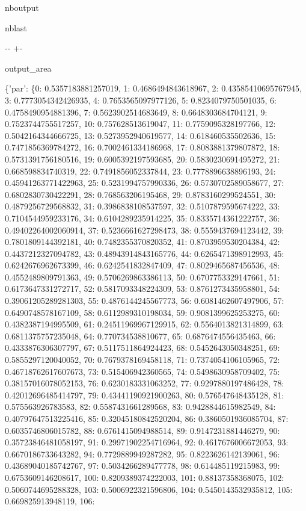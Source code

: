 \documentclass[letterpaper,10pt,english]{sphinxmanual}
\begin{document}
\begin{sphinxuseclass}{nboutput}
\begin{sphinxuseclass}{nblast}
{

\kern-\sphinxverbatimsmallskipamount\kern-\baselineskip
\kern+\FrameHeightAdjust\kern-\fboxrule
\vspace{\nbsphinxcodecellspacing}

\begin{sphinxuseclass}{output_area}
\begin{sphinxuseclass}{}


\begin{sphinxVerbatim}[commandchars=\\\{\}]
\{'par': \{0: 0.5357183881257019, 1: 0.4686494843618967, 2: 0.43585410695767945, 3: 0.7773054342426935, 4: 0.7653565097977126, 5: 0.8234079750501035, 6: 0.4758490954881396, 7: 0.5623902514683649, 8: 0.6648303684704121, 9: 0.7523744755517257, 10: 0.757628513619047, 11: 0.7759095328197766, 12: 0.5042164344666725, 13: 0.5273952940619577, 14: 0.618460535502636, 15: 0.7471856369784272, 16: 0.7002461334186968, 17: 0.8083881379807872, 18: 0.5731391756180516, 19: 0.6005392197593685, 20: 0.5830230691495272, 21: 0.668598834740319, 22: 0.7491856052337844, 23: 0.7778896638896193, 24: 0.45941263771422963, 25: 0.5231994757990336, 26: 0.5730702589058677, 27: 0.6802830730422291, 28: 0.768563206195468, 29: 0.8783160299524551, 30: 0.4879256729568832, 31: 0.3986838108537597, 32: 0.5107879595674222, 33: 0.7104544959233176, 34: 0.6104289235914225, 35: 0.8335714361222757, 36: 0.49402264002060914, 37: 0.5236661627298473, 38: 0.5559437694123442, 39: 0.7801809144392181, 40: 0.7482355370820352, 41: 0.8703959530204384, 42: 0.4437212327094782, 43: 0.48943914843165776, 44: 0.6265471398912993, 45: 0.6242676962673399, 46: 0.6242541832847409, 47: 0.8029465687456536, 48: 0.4552489809791363, 49: 0.5706269863386113, 50: 0.6707753329147661, 51: 0.6173647331272717, 52: 0.5817093348224309, 53: 0.8761273435958801, 54: 0.39061205289281303, 55: 0.4876144245567773, 56: 0.6081462607497906, 57: 0.6490748578167109, 58: 0.6112989310198034, 59: 0.9081399625253275, 60: 0.4382387194995509, 61: 0.24511969967129915, 62: 0.5564013821314899, 63: 0.6811375757235048, 64: 0.770734538810677, 65: 0.6876474556435463, 66: 0.4333876306307797, 67: 0.5117511864924423, 68: 0.5452643050348251, 69: 0.5855297120040052, 70: 0.7679378169458118, 71: 0.7374054106105965, 72: 0.46718762617607673, 73: 0.515406942360565, 74: 0.5498630958709402, 75: 0.38157016078052153, 76: 0.6230183331063252, 77: 0.9297880197486428, 78: 0.42012696485414797, 79: 0.43441190921900263, 80: 0.576547648435128, 81: 0.575563926783583, 82: 0.5587431661289568, 83: 0.9428844615982549, 84: 0.40797647513225416, 85: 0.32045180842520204, 86: 0.3860501936085704, 87: 0.6035746806015782, 88: 0.6761415094988514, 89: 0.9147231881446279, 90: 0.35723846481058197, 91: 0.29971902254716964, 92: 0.4617676006672053, 93: 0.6670186733643282, 94: 0.7729889949287282, 95: 0.8223626142139061, 96: 0.43689040185742767, 97: 0.5034266289477778, 98: 0.614485119215983, 99: 0.6753609146208617, 100: 0.8209389374222003, 101: 0.88137358368075, 102: 0.5060744695288328, 103: 0.5006922321596806, 104: 0.5450143532935812, 105: 0.669825913948119, 106: 
\end{sphinxVerbatim}
\end{sphinxuseclass}
\end{sphinxuseclass}}
\end{sphinxuseclass}
\end{sphinxuseclass}
\end{document}
